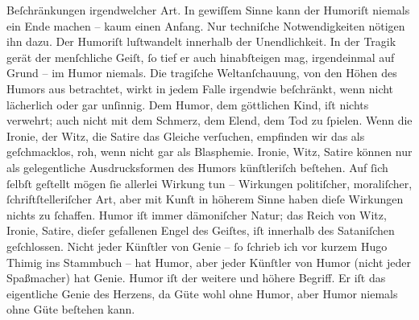 \begin{ledgroupsized}[t]{13cm}
                  Beſchränkungen irgendwelcher Art. In gewiſſem Sinne kann der Humoriſt niemals ein
                  Ende machen – kaum einen Anfang. Nur techniſche Notwendigkeiten nötigen ihn
                  dazu.\pend
           \pstart
           Der Humoriſt luſtwandelt innerhalb der Unendlichkeit.\pend
           \pstart
           In der Tragik gerät der menſchliche Geiſt, ſo tief er auch hinabſteigen mag,
                  irgendeinmal auf Grund – im Humor niemals.\pend
           \pstart
           Die tragiſche Weltanſchauung, von den Höhen des Humors aus betrachtet, wirkt in
                  jedem Falle irgendwie beſchränkt, wenn nicht lächerlich oder gar unſinnig.\pend
           \pstart
           Dem Humor, dem göttlichen Kind, iſt nichts verwehrt; auch nicht mit dem Schmerz,
                  dem Elend, dem Tod zu ſpielen. Wenn die Ironie, der Witz, die Satire das Gleiche
                  verſuchen, empfinden wir das als geſchmacklos, roh, wenn nicht gar als
                  Blasphemie.\pend
           \pstart
           Ironie, Witz, Satire können nur als gelegentliche Ausdrucksformen des Humors
                  künſtleriſch beſtehen. Auf ſich ſelbſt geſtellt mögen ſie allerlei Wirkung tun –
                  Wirkungen politiſcher, moraliſcher, ſchriftſtelleriſcher Art, aber mit Kunſt in
                  höherem Sinne haben dieſe Wirkungen nichts zu ſchaffen.\pend
           \pstart
           Humor iſt immer dämoniſcher Natur; das Reich von Witz, Ironie, Satire, dieſer
                  gefallenen Engel des Geiſtes, iſt innerhalb des Sataniſchen geſchlossen.\pend
           \pstart
           Nicht jeder Künſtler von Genie – ſo ſchrieb ich vor kurzem Hugo Thimig ins Stammbuch – hat Humor, aber jeder Künſtler
                  von Humor (nicht jeder Spaßmacher) hat Genie. Humor iſt der weitere und höhere
                  Begriff. Er iſt das eigentliche Genie des Herzens, da Güte wohl ohne Humor, aber
                  Humor niemals ohne Güte beſtehen kann.\pend
           \endnumbering{}\end{ledgroupsized}  \newcommand{\dateiname}{L02442}\newcommand{\titel}{Arthur Schnitzler an Thomas Mann, 7. 6. 1925}\newcommand{\editorInnen}{Martin Anton Müller und Gerd-Hermann Susen}
      